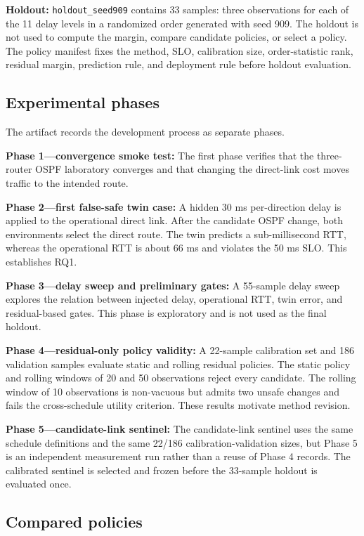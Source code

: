 \textbf{Holdout:} \texttt{holdout\_seed909} contains 33 samples: three observations for each of the 11 delay levels in a randomized order generated with seed 909. The holdout is not used to compute the margin, compare candidate policies, or select a policy. The policy manifest fixes the method, SLO, calibration size, order-statistic rank, residual margin, prediction rule, and deployment rule before holdout evaluation.

\subsection{Experimental phases}

The artifact records the development process as separate phases.

\textbf{Phase 1---convergence smoke test:} The first phase verifies that the three-router OSPF laboratory converges and that changing the direct-link cost moves traffic to the intended route.

\textbf{Phase 2---first false-safe twin case:} A hidden 30 ms per-direction delay is applied to the operational direct link. After the candidate OSPF change, both environments select the direct route. The twin predicts a sub-millisecond RTT, whereas the operational RTT is about 66 ms and violates the 50 ms SLO. This establishes RQ1.

\textbf{Phase 3---delay sweep and preliminary gates:} A 55-sample delay sweep explores the relation between injected delay, operational RTT, twin error, and residual-based gates. This phase is exploratory and is not used as the final holdout.

\textbf{Phase 4---residual-only policy validity:} A 22-sample calibration set and 186 validation samples evaluate static and rolling residual policies. The static policy and rolling windows of 20 and 50 observations reject every candidate. The rolling window of 10 observations is non-vacuous but admits two unsafe changes and fails the cross-schedule utility criterion. These results motivate method revision.

\textbf{Phase 5---candidate-link sentinel:} The candidate-link sentinel uses the same schedule definitions and the same 22/186 calibration-validation sizes, but Phase 5 is an independent measurement run rather than a reuse of Phase 4 records. The calibrated sentinel is selected and frozen before the 33-sample holdout is evaluated once.

\subsection{Compared policies}

